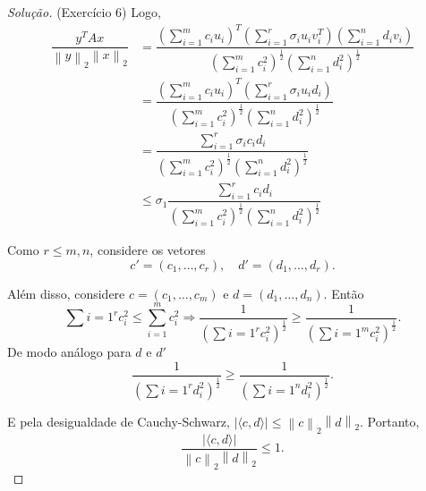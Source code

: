 \documentclass[a4paper,10pt]{article}
\newenvironment{solution}
  {\begin{proof}[Solução]}
  {\end{proof}}
\newcommand{\norm}[1]{\left\lVert#1\right\rVert}
\begin{document}
\begin{solution}{(Exercício 6)}
    Logo,
    \begin{equation}\label{eq:eqdes}
      \begin{split}
        \dfrac{y^TAx}{\norm{y}_2\norm{x}_2} &= \dfrac{\left( \sum_{i=1}^{m} c_i u_i\right)^T
        \left( \sum_{i=1}^{r} \sigma_iu_iv_i^T \right)
        \left( \sum_{i=1}^{n} d_i v_i\right)}{\left( \sum_{i=1}^{m}c_i^2 \right)^{\frac{1}{2}}
        \left(\sum_{i=1}^{n} d_i^2 \right)^{\frac{1}{2}} } \\
        &= \dfrac{\left( \sum_{i=1}^{m} c_i u_i \right)^T
        \left( \sum_{i=1}^{r} \sigma_i u_i d_i \right)}{\left( \sum_{i=1}^{m}c_i^2 \right)^{\frac{1}{2}}
        \left(\sum_{i=1}^{n} d_i^2 \right)^{\frac{1}{2}} } \\
        &= \dfrac{\sum_{i=1}^{r} \sigma_i c_i d_i}{\left( \sum_{i=1}^{m}c_i^2 \right)^{\frac{1}{2}}
        \left(\sum_{i=1}^{n} d_i^2 \right)^{\frac{1}{2}} } \\
        & \leq \sigma_1 \dfrac{\sum_{i=1}^{r} c_i d_i}{ \left( \sum_{i=1}^{m} c_i^2 \right)^{\frac{1}{2}}
        \left(\sum_{i=1}^{n} d_i^2 \right)^{\frac{1}{2}} }
      \end{split}
    \end{equation}

    Como $r \leq m,n$, considere os vetores
    \begin{equation*}
      c' = (c_1, \dots, c_r), \quad d' = (d_1, \dots, d_r).
    \end{equation*}

    Além disso, considere $c = (c_1, \dots, c_m)$ e $d = (d_1, \dots, d_n)$. Então
    \begin{equation*}
      \sum{i=1}^{r} c_i^2 \leq \sum_{i=1}^{m} c_i^2 \Rightarrow
      \dfrac{1}{\left( \sum{i=1}^{r} c_i^2 \right)^\frac{1}{2}} \geq
      \dfrac{1}{\left( \sum{i=1}^{m} c_i^2 \right)^\frac{1}{2}}.
    \end{equation*}
    De modo análogo para $d$ e $d'$
    \begin{equation*}
      \dfrac{1}{\left( \sum{i=1}^{r} d_i^2 \right)^\frac{1}{2}} \geq
      \dfrac{1}{\left( \sum{i=1}^{n} d_i^2 \right)^\frac{1}{2}}.
    \end{equation*}

    E pela desigualdade de Cauchy-Schwarz, $|\langle c,d \rangle| \leq \norm{c}_2 \norm{d}_2$.
    Portanto,
    \begin{equation*}
      \frac{|\langle c,d \rangle|}{\norm{c}_2 \norm{d}_2} \leq 1.
    \end{equation*}


\end{solution}
\end{document}
